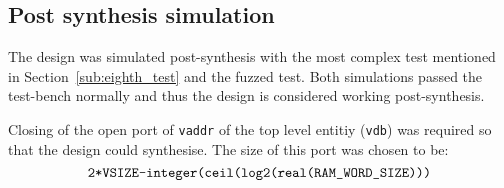 \documentclass[]{article}
\begin{document}

\subsection{Post synthesis simulation} %
\label{sub:post_synthesis_simulation}

The design was simulated post-synthesis with the most complex test mentioned in Section~\ref{sub:eighth_test} and the fuzzed test. Both simulations passed the test-bench normally and thus the design is considered working post-synthesis.

Closing of the open port of \verb"vaddr" of the top level entitiy (\verb"vdb") was required so that the design could synthesise. The size of this port was chosen to be:
\begin{equation}
	\verb"2*VSIZE-integer(ceil(log2(real(RAM_WORD_SIZE)))"
\end{equation}

\end{document}
